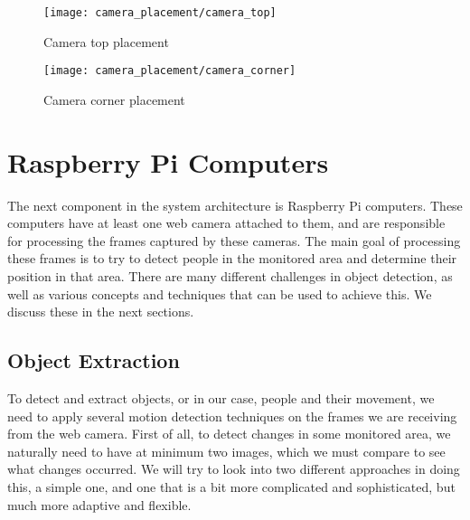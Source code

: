 \begin{figure}[ht]
	\centering
	\texttt{[image: camera\_placement/camera\_top]}
	\caption{Camera top placement}
	\label{fig:camera_top}
\end{figure}

\begin{figure}[ht]
	\centering
	\texttt{[image: camera\_placement/camera\_corner]}
	\caption{Camera corner placement}
	\label{fig:camera_corner}
\end{figure}

\section{Raspberry Pi Computers}
The next component in the system architecture is Raspberry Pi computers. These computers have at least one web camera attached to them, and are responsible for processing the frames captured by these cameras. The main goal of processing these frames is to try to detect people in the monitored area and determine their position in that area. There are many different challenges in object detection, as well as various concepts and techniques that can be used to achieve this. We discuss these in the next sections.
	
	\subsection{Object Extraction}
	\label{sec:object_extraction}
	To detect and extract objects, or in our case, people and their movement, we need to apply several motion detection techniques on the frames we are receiving from the web camera. First of all, to detect changes in some monitored area, we naturally need to have at minimum two images, which we must compare to see what changes occurred. We will try to look into two different approaches in doing this, a simple one, and one that is a bit more complicated and sophisticated, but much more adaptive and flexible.
	
